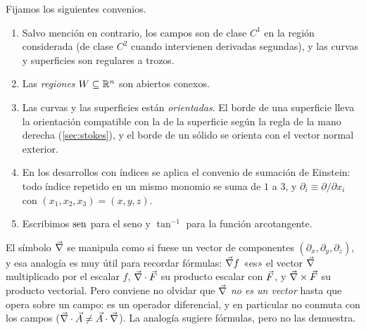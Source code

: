 \begin{notacion}\label{not:convenios}
Fijamos los siguientes convenios.\begin{enumerate}[label=(\alph*)]
  \item Salvo mención en contrario, los campos son de clase $C^{1}$ en la región
        considerada (de clase $C^{2}$ cuando intervienen derivadas segundas), y
        las curvas y superficies son regulares a trozos.
  \item Las \emph{regiones} $W\subseteq\mathbb{R}^{n}$ son abiertos conexos.
  \item Las curvas y las superficies están \emph{orientadas}. El borde de una
        superficie lleva la orientación compatible con la de la superficie
        según la regla de la mano derecha (\cref{sec:stokes}), y el borde de
        un sólido se orienta con el vector normal exterior.
  \item En los desarrollos con índices se aplica el convenio de sumación de
        Einstein: todo índice repetido en un mismo monomio se suma de $1$ a $3$,
        y $\partial_i\equiv\partial/\partial x_i$ con
        $(x_1,x_2,x_3)=(x,y,z)$.
  \item Escribimos $\operatorname{sen}$ para el seno y $\tan^{-1}$ para la función arcotangente.
\end{enumerate}
\end{notacion}

\begin{observacion}\label{obs:nabla}
El símbolo $\vec{\nabla}$ se manipula como si fuese un vector de componentes
$(\partial_x,\partial_y,\partial_z)$, y esa analogía es muy útil para recordar
fórmulas: $\vec{\nabla} f$ «es» el vector $\vec{\nabla}$ multiplicado por el escalar $f$,
$\vec{\nabla}\cdot\vec{F}$ su producto escalar con $\vec{F}$, y $\vec{\nabla}\times\vec{F}$ su
producto vectorial. Pero conviene no olvidar que $\vec{\nabla}$ \emph{no es un vector}
hasta que opera sobre un campo: es un operador diferencial, y en particular no
conmuta con los campos ($\vec{\nabla}\cdot\vec{A}\neq\vec{A}\cdot\vec{\nabla}$). La analogía
sugiere fórmulas, pero no las demuestra.
\end{observacion}
